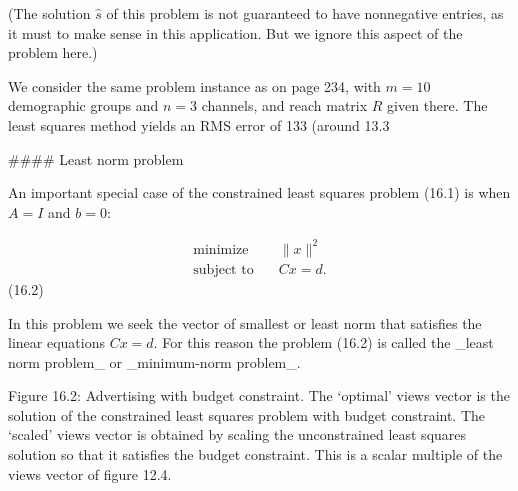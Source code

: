 (The solution \(\hat{s}\) of this problem is not guaranteed to have nonnegative entries, as it must to make sense in this application. But we ignore this aspect of the problem here.)

We consider the same problem instance as on page 234, with \(m=10\) demographic groups and \(n=3\) channels, and reach matrix \(R\) given there. The least squares method yields an RMS error of 133 (around 13.3%

#### Least norm problem

An important special case of the constrained least squares problem (16.1) is when \(A=I\) and \(b=0\):

\[\begin{array}{ll}\text{minimize}&\quad\|x\|^{2}\\ \text{subject to}&\quad Cx=d.\end{array}\] (16.2)

In this problem we seek the vector of smallest or least norm that satisfies the linear equations \(Cx=d\). For this reason the problem (16.2) is called the _least norm problem_ or _minimum-norm problem_.

Figure 16.2: Advertising with budget constraint. The ‘optimal’ views vector is the solution of the constrained least squares problem with budget constraint. The ‘scaled’ views vector is obtained by scaling the unconstrained least squares solution so that it satisfies the budget constraint. This is a scalar multiple of the views vector of figure 12.4.

 